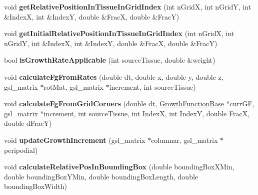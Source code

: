 \begin{DoxyCompactItemize}
\item 
\hypertarget{classShapeBase_a13cf955dcc9db425c762053468578d72}{}void {\bfseries get\+Relative\+Position\+In\+Tissue\+In\+Grid\+Index} (int n\+Grid\+X, int n\+Grid\+Y, int \&Index\+X, int \&Index\+Y, double \&Frac\+X, double \&Frac\+Y)\label{classShapeBase_a13cf955dcc9db425c762053468578d72}

\item 
\hypertarget{classShapeBase_a2e91ece1ff8f6cfa8d8c495a3afc59c5}{}void {\bfseries get\+Initial\+Relative\+Position\+In\+Tissue\+In\+Grid\+Index} (int n\+Grid\+X, int n\+Grid\+Y, int \&Index\+X, int \&Index\+Y, double \&Frac\+X, double \&Frac\+Y)\label{classShapeBase_a2e91ece1ff8f6cfa8d8c495a3afc59c5}

\item 
\hypertarget{classShapeBase_a7c429bc57f1b16e3e1d4f2bb98360298}{}bool {\bfseries is\+Growth\+Rate\+Applicable} (int source\+Tissue, double \&weight)\label{classShapeBase_a7c429bc57f1b16e3e1d4f2bb98360298}

\item 
\hypertarget{classShapeBase_a33c9507a7e08fd529b28f70e62dfb33e}{}void {\bfseries calculate\+Fg\+From\+Rates} (double dt, double x, double y, double z, gsl\+\_\+matrix $\ast$rot\+Mat, gsl\+\_\+matrix $\ast$increment, int source\+Tissue)\label{classShapeBase_a33c9507a7e08fd529b28f70e62dfb33e}

\item 
\hypertarget{classShapeBase_ad158010ec26f607c4695aa7a0b767d73}{}void {\bfseries calculate\+Fg\+From\+Grid\+Corners} (double dt, \hyperlink{classGrowthFunctionBase}{Growth\+Function\+Base} $\ast$curr\+G\+F, gsl\+\_\+matrix $\ast$increment, int source\+Tissue, int Index\+X, int Index\+Y, double Frac\+X, double d\+Frac\+Y)\label{classShapeBase_ad158010ec26f607c4695aa7a0b767d73}

\item 
\hypertarget{classShapeBase_a009b5aed1c546db5e517f9f33f67b066}{}void {\bfseries update\+Growth\+Increment} (gsl\+\_\+matrix $\ast$columnar, gsl\+\_\+matrix $\ast$peripodial)\label{classShapeBase_a009b5aed1c546db5e517f9f33f67b066}

\item 
\hypertarget{classShapeBase_a04278729ad9cc3238b1966ade0685a3d}{}void {\bfseries calculate\+Relative\+Pos\+In\+Bounding\+Box} (double bounding\+Box\+X\+Min, double bounding\+Box\+Y\+Min, double bounding\+Box\+Length, double bounding\+Box\+Width)\label{classShapeBase_a04278729ad9cc3238b1966ade0685a3d}


\end{DoxyCompactItemize}
